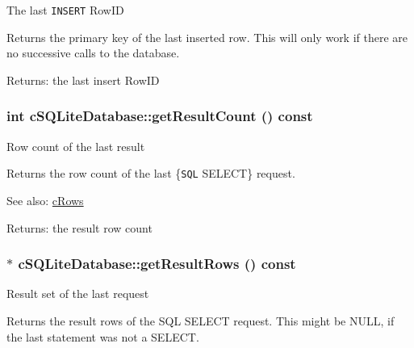 The last {\tt INSERT} RowID

Returns the primary key of the last inserted row. This will only work if there are no successive calls to the database.

\begin{Desc}
\item[Returns:]the last insert RowID \end{Desc}
\hypertarget{classcSQLiteDatabase_2119fbbf7a02c9c627038ddc14c9eb48}{
\subsubsection[{getResultCount}]{\setlength{\rightskip}{0pt plus 5cm}int cSQLiteDatabase::getResultCount () const}}
\label{classcSQLiteDatabase_2119fbbf7a02c9c627038ddc14c9eb48}


Row count of the last result

Returns the row count of the last \{{\tt SQL} SELECT\} request.

\begin{Desc}
\item[See also:]\hyperlink{classcRows}{cRows} \end{Desc}
\begin{Desc}
\item[Returns:]the result row count \end{Desc}
\hypertarget{classcSQLiteDatabase_4cd24d9d63173c54b63aadc7ada86e7e}{
\subsubsection[{getResultRows}]{$\ast$ cSQLiteDatabase::getResultRows () const}}
\label{classcSQLiteDatabase_4cd24d9d63173c54b63aadc7ada86e7e}


Result set of the last request

Returns the result rows of the SQL SELECT request. This might be NULL, if the last statement was not a SELECT.

